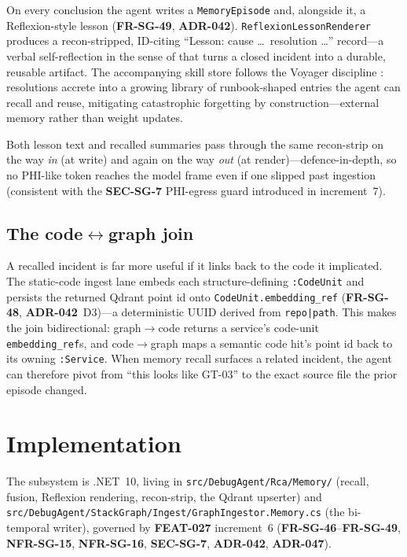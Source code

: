 \documentclass[11pt]{article}
\begin{document}
On every conclusion the agent writes a \texttt{MemoryEpisode} and, alongside it, a
Reflexion-style lesson (\textbf{FR-SG-49}, \textbf{ADR-042}).
\texttt{ReflexionLessonRenderer} produces a recon-stripped, ID-citing ``Lesson:
cause \ldots\ resolution \ldots'' record---a verbal self-reflection in the sense
of \citet{shinn2023reflexion} that turns a closed incident into a durable,
reusable artifact. The accompanying skill store follows the Voyager discipline
\citep{wang2023voyager}: resolutions accrete into a growing library of
runbook-shaped entries the agent can recall and reuse, mitigating catastrophic
forgetting by construction---external memory rather than weight updates.

Both lesson text and recalled summaries pass through the same recon-strip on the
way \emph{in} (at write) and again on the way \emph{out} (at render)---defence-in-depth,
so no PHI-like token reaches the model frame even if one slipped past ingestion
(consistent with the \textbf{SEC-SG-7} PHI-egress guard introduced in
increment~7).

\subsection{The code$\leftrightarrow$graph join}

A recalled incident is far more useful if it links back to the code it implicated.
The static-code ingest lane embeds each structure-defining \texttt{:CodeUnit} and
persists the returned Qdrant point id onto \texttt{CodeUnit.embedding\_ref}
(\textbf{FR-SG-48}, \textbf{ADR-042}~D3)---a deterministic UUID derived from
\texttt{repo|path}. This makes the join bidirectional: graph$\to$code returns a
service's code-unit \texttt{embedding\_ref}s, and code$\to$graph maps a semantic
code hit's point id back to its owning \texttt{:Service}. When memory recall
surfaces a related incident, the agent can therefore pivot from ``this looks like
GT-03'' to the exact source file the prior episode changed.

\section{Implementation}
\label{sec:impl}

The subsystem is .NET~10, living in \texttt{src/DebugAgent/Rca/Memory/} (recall,
fusion, Reflexion rendering, recon-strip, the Qdrant upserter) and
\texttt{src/DebugAgent/StackGraph/Ingest/GraphIngestor.Memory.cs} (the bi-temporal
writer), governed by \textbf{FEAT-027} increment~6 (\textbf{FR-SG-46}--\textbf{FR-SG-49},
\textbf{NFR-SG-15}, \textbf{NFR-SG-16}, \textbf{SEC-SG-7}, \textbf{ADR-042},
\textbf{ADR-047}).
\end{document}
